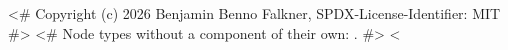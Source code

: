 <# Copyright (c) 2026 Benjamin Benno Falkner, SPDX-License-Identifier: MIT #>
<# Node types without a component of their own: . #>
<%
